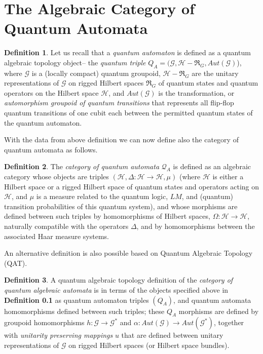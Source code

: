 \documentclass[12pt]{article}
\theoremstyle{plain}
\theoremstyle{definition}
\newtheorem{definition}{Definition}[section]
\numberwithin{equation}{section}
\renewcommand{\H}{\mathcal H}
\newcommand{\Q}{\mathcal Q}
\renewcommand{\O}{\Omega}
\newcommand{\grp}{\mathcal G}
\begin{document}
\section{The Algebraic Category of Quantum Automata}

\begin{definition}
Let us recall that a \emph{quantum automaton} is defined as a quantum algebraic topology object-- the \emph{quantum
triple} $Q_A =(\grp,\H -\Re_G, Aut(\grp)$), where $\grp$ is a (locally compact) quantum groupoid, $\H -\Re_G$ are the unitary representations of $\grp$ on rigged Hilbert spaces $\Re_G$ of quantum states and quantum operators on the Hilbert space $\H$, and $Aut(\grp)$ is the transformation, or \emph{automorphism groupoid of quantum transitions} that represents all flip-flop quantum transitions of one cubit each between the permitted quantum states of the quantum automaton.
\end{definition} 

With the data from above definition we can now define also the category of quantum automata as follows.

\begin{definition} The \emph{category of quantum automata} $\mathcal{\Q}_A$
is defined as an algebraic category whose objects are triples $(\H, \Delta: \H \rightarrow \H, \mu)$ (where $\H$ is either a Hilbert space or a rigged Hilbert space of quantum states and operators acting on 
$\H$, and $\mu$ is a measure related to the quantum logic, $LM$, and (quantum) transition probabilities of this quantum system), and whose morphisms are defined between such triples by homomorphisms of Hilbert spaces, 
$\O: \H \rightarrow \H$, naturally compatible with the operators $\Delta$, and by homomorphisms between the associated Haar measure systems. 
\end{definition}

An alternative definition is also possible based on Quantum Algebraic Topology (QAT). 

\begin{definition} A quantum algebraic topology definition of the {\em category of quantum algebraic automata} is in terms of the objects specified above in \textbf{Definition 0.1} as quantum automaton triples $(Q_A)$,
and quantum automata homomorphisms defined between such triples; these $Q_A$ morphisms are defined by
groupoid homomorphisms $h: \grp \rightarrow \grp ^*$ and $\alpha: Aut(\grp) \rightarrow Aut(\grp ^*)$, together
with {\em unitarity preserving mappings} $u$ that are defined between unitary representations of $\grp$ on rigged Hilbert spaces (or Hilbert space bundles).
\end{definition}


\end{document}
